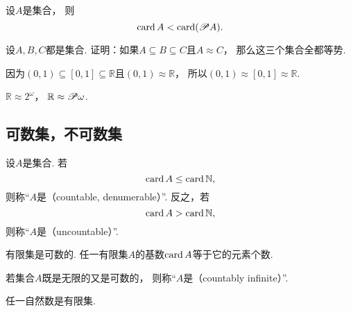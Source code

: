 \begin{proposition}
设\(A\)是集合，
则\[
	\operatorname{card} A < \operatorname{card}(\mathscr{P} A).
\]
\end{proposition}

\begin{example}
设\(A,B,C\)都是集合.
证明：如果\(A \subseteq B \subseteq C\)且\(A \approx C\)，
那么这三个集合全都等势.
\end{example}

\begin{example}
因为\((0,1)\subseteq[0,1]\subseteq\mathbb{R}\)且\((0,1)\approx\mathbb{R}\)，
所以\((0,1)\approx[0,1]\approx\mathbb{R}\).
\end{example}

\begin{example}
\(\mathbb{R}\approx2^\omega\)，
\(\mathbb{R}\approx\mathscr{P}\omega\).
\end{example}

\subsection{可数集，不可数集}
\begin{definition}
设\(A\)是集合.
若\[
	\operatorname{card} A \leq \operatorname{card}\mathbb{N},
\]
则称“\(A\)是（countable, denumerable）”.
反之，若\[
	\operatorname{card} A > \operatorname{card}\mathbb{N},
\]
则称“\(A\)是（uncountable）”.
\end{definition}

\begin{proposition}
有限集是可数的.
任一有限集\(A\)的基数\(\operatorname{card} A\)等于它的元素个数.
\end{proposition}

\begin{definition}
若集合\(A\)既是无限的又是可数的，
则称“\(A\)是（countably infinite）”.
\end{definition}

\begin{example}
任一自然数是有限集.
\end{example}


